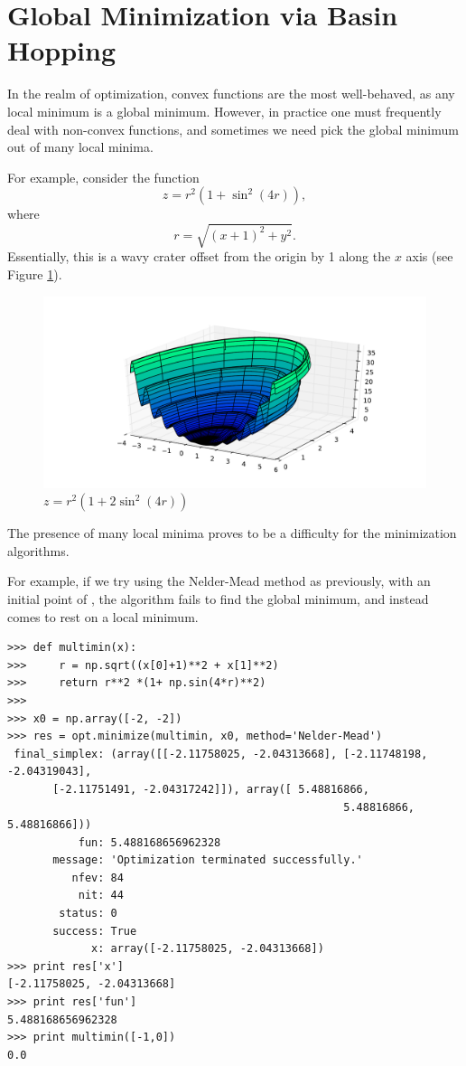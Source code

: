\section*{Global Minimization via Basin Hopping} %

In the realm of optimization, convex functions are the most well-behaved, as any local minimum is a global minimum.
However, in practice one must frequently deal with non-convex functions, and sometimes we need pick the global minimum out of many local minima.

For example, consider the function
\[
z = r^2 (1+ \sin^2(4r)),
\]
where
\[
r = \sqrt{(x+1)^2 + y^2}.
\]
Essentially, this is a wavy crater offset from the origin by 1 along the $x$ axis (see Figure \ref{opt:multimin}).
\begin{figure}
\includegraphics[width=\textwidth]{ManyMinima.pdf}
\caption{$z = r^2 (1+ 2\sin^2(4r))$}
\label{opt:multimin}
\end{figure}
The presence of many local minima proves to be a difficulty for the minimization algorithms.

For example, if we try using the Nelder-Mead method as previously, with an initial point of , the algorithm fails to find the global minimum, and instead comes to rest on a local minimum.
\begin{lstlisting}
>>> def multimin(x):
>>>     r = np.sqrt((x[0]+1)**2 + x[1]**2)
>>>     return r**2 *(1+ np.sin(4*r)**2)
>>>
>>> x0 = np.array([-2, -2])
>>> res = opt.minimize(multimin, x0, method='Nelder-Mead')
 final_simplex: (array([[-2.11758025, -2.04313668], [-2.11748198, -2.04319043],
       [-2.11751491, -2.04317242]]), array([ 5.48816866,  
       												5.48816866,  5.48816866]))
           fun: 5.488168656962328
       message: 'Optimization terminated successfully.'
          nfev: 84
           nit: 44
        status: 0
       success: True
             x: array([-2.11758025, -2.04313668])
>>> print res['x']
[-2.11758025, -2.04313668]
>>> print res['fun']
5.488168656962328
>>> print multimin([-1,0])
0.0
\end{lstlisting}

